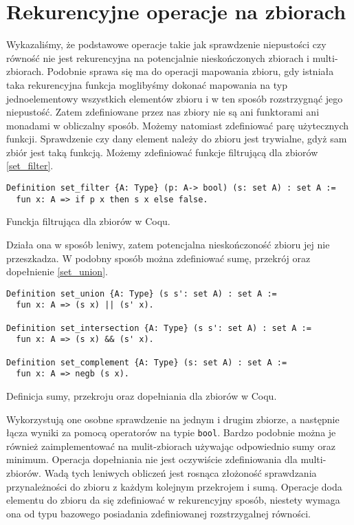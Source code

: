 \section{Rekurencyjne operacje na zbiorach}
Wykazaliśmy, że podstawowe operacje takie jak sprawdzenie niepustości czy równość nie jest rekurencyjna na potencjalnie nieskończonych zbiorach i multi-zbiorach. Podobnie sprawa się ma do operacji mapowania zbioru, gdy istniała taka rekurencyjna funkcja moglibyśmy dokonać mapowania na typ jednoelementowy wszystkich elementów zbioru i w ten sposób rozstrzygnąć jego niepustość. Zatem zdefiniowane przez nas zbiory nie są ani funktorami ani monadami w obliczalny sposób. Możemy natomiast zdefiniować parę użytecznych funkcji. Sprawdzenie czy dany element należy do zbioru jest trywialne, gdyż sam zbiór jest taką funkcją. Możemy zdefiniować funkcje filtrującą dla zbiorów \ref{set_filter}.
\begin{code}
\begin{verbatim}
Definition set_filter {A: Type} (p: A-> bool) (s: set A) : set A :=
  fun x: A => if p x then s x else false.
\end{verbatim}
\caption{Funckja filtrująca dla zbiorów w Coqu.}
\label{set_filter}
\end{code}
Działa ona w sposób leniwy, zatem potencjalna nieskończoność zbioru jej nie przeszkadza. W podobny sposób można zdefiniować sumę, przekrój oraz dopełnienie \ref{set_union}.
\begin{code}
\begin{verbatim}
Definition set_union {A: Type} (s s': set A) : set A :=
  fun x: A => (s x) || (s' x).

Definition set_intersection {A: Type} (s s': set A) : set A :=
  fun x: A => (s x) && (s' x).

Definition set_complement {A: Type} (s: set A) : set A :=
  fun x: A => negb (s x).
\end{verbatim}
\caption{Definicja sumy, przekroju oraz dopełniania dla zbiorów w Coqu.}
\label{set_union}
\end{code}
Wykorzystują one osobne sprawdzenie na jednym i drugim zbiorze, a następnie łącza wyniki za pomocą operatorów na typie \texttt{bool}. Bardzo podobnie można je również zaimplementować na mulit-zbiorach używając odpowiednio sumy oraz minimum. Operacja dopełniania nie jest oczywiście zdefiniowania dla multi-zbiorów. Wadą tych leniwych obliczeń jest rosnąca złożoność sprawdzania przynależności do zbioru z każdym kolejnym przekrojem i sumą. Operacje doda elementu do zbioru da się zdefiniować w rekurencyjny sposób, niestety wymaga ona od typu bazowego posiadania zdefiniowanej rozstrzygalnej równości. 
